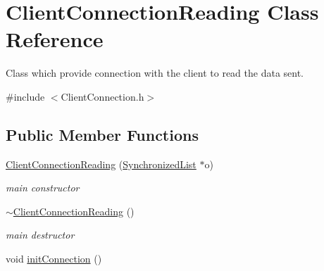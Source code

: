 \hypertarget{class_client_connection_reading}{\section{Client\-Connection\-Reading Class Reference}
\label{class_client_connection_reading}
}


Class which provide connection with the client to read the data sent.  




{\ttfamily \#include $<$Client\-Connection.\-h$>$}

\subsection*{Public Member Functions}
\begin{DoxyCompactItemize}
\item 
\hyperlink{class_client_connection_reading_ac5c9eca35e27a5f85e45ae05ea11c22e}{Client\-Connection\-Reading} (\hyperlink{class_synchronized_list}{Synchronized\-List} $\ast$o)
\begin{DoxyCompactList}\small\item\em main constructor \end{DoxyCompactList}\item 
\hypertarget{class_client_connection_reading_a2fc2fc7df13e26f41f6c3a7e4ccaf356}{\hyperlink{class_client_connection_reading_a2fc2fc7df13e26f41f6c3a7e4ccaf356}{$\sim$\-Client\-Connection\-Reading} ()}\label{class_client_connection_reading_a2fc2fc7df13e26f41f6c3a7e4ccaf356}

\begin{DoxyCompactList}\small\item\em main destructor \end{DoxyCompactList}\item 
\hypertarget{class_client_connection_reading_ac6024deba8dd44207b744b2c8fcd3468}{void \hyperlink{class_client_connection_reading_ac6024deba8dd44207b744b2c8fcd3468}{init\-Connection} ()}\label{class_client_connection_reading_ac6024deba8dd44207b744b2c8fcd3468}


\end{DoxyCompactItemize}
